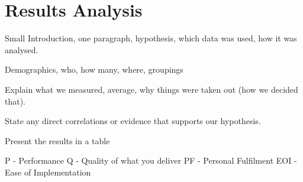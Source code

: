 \documentclass[final_report_innit.tex]{subfiles}
\begin{document}
\section{Results Analysis}

Small Introduction, one paragraph, hypothesis, which data was used, how it was analysed.

Demographics, who, how many, where, groupings

Explain what we measured, average, why things were taken out (how we decided that).

State any direct correlations or evidence that supports our hypothesis.

Present the results in a table

P - Performance
Q - Quality of what you deliver
PF - Personal Fulfilment
EOI - Ease of Implementation
\end{document}

